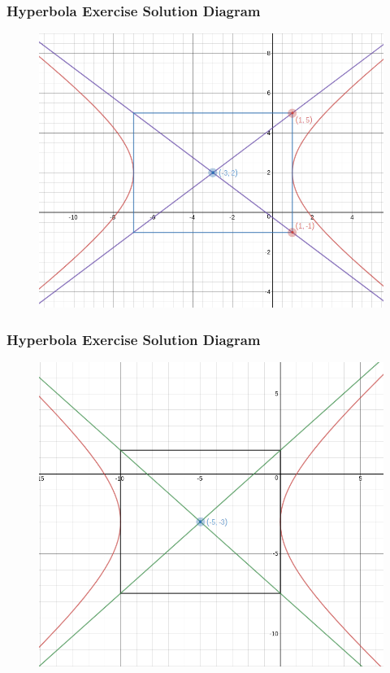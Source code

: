 \documentclass[xcolor=dvipsnames]{beamer}
\begin{document}
\begin{frame}
  \frametitle{Hyperbola Exercise Solution Diagram}
  \begin{figure}[h]
    \includegraphics[scale=.4]{./hyperbola3.png}
  \end{figure}
\end{frame}

\begin{frame}
  \frametitle{Hyperbola Exercise Solution Diagram}
  \begin{figure}[h]
    \includegraphics[scale=.4]{./hyperbola4.png}
  \end{figure}
\end{frame}
\end{document}
